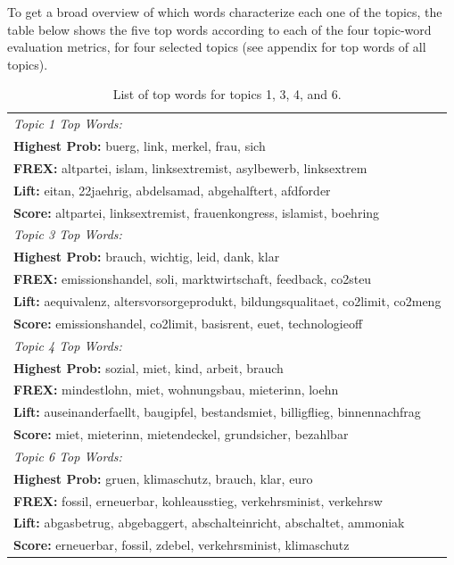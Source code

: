 To get a broad overview of which words characterize each one of the topics, the table below shows the five top words according to each of the four topic-word evaluation metrics, for four selected topics (see appendix for top words of all topics).

\begin{table}[h!]
\centering
\captionsetup{justification=centering,margin=2cm}
\begin{tabular}{|l|}
\hline
\textit{Topic 1 Top Words:}\\
 	 \textbf{Highest Prob:} buerg, link, merkel, frau, sich \\
 	 \textbf{FREX:} altpartei, islam, linksextremist, asylbewerb, linksextrem \\
 	 \textbf{Lift:} eitan, 22jaehrig, abdelsamad, abgehalftert, afdforder \\
 	 \textbf{Score:} altpartei, linksextremist, frauenkongress, islamist, boehring \\
\hline
\textit{Topic 3 Top Words:}\\
 	 \textbf{Highest Prob:} brauch, wichtig, leid, dank, klar \\
 	 \textbf{FREX:} emissionshandel, soli, marktwirtschaft, feedback, co2steu \\
 	 \textbf{Lift:} aequivalenz, altersvorsorgeprodukt, bildungsqualitaet, co2limit, co2meng \\
 	 \textbf{Score:} emissionshandel, co2limit, basisrent, euet, technologieoff \\
\hline
\textit{Topic 4 Top Words:}\\
 	 \textbf{Highest Prob:} sozial, miet, kind, arbeit, brauch \\
 	 \textbf{FREX:} mindestlohn, miet, wohnungsbau, mieterinn, loehn \\
 	 \textbf{Lift:} auseinanderfaellt, baugipfel, bestandsmiet, billigflieg, binnennachfrag \\
 	 \textbf{Score:} miet, mieterinn, mietendeckel, grundsicher, bezahlbar \\
\hline
\textit{Topic 6 Top Words:}\\
 	 \textbf{Highest Prob:} gruen, klimaschutz, brauch, klar, euro \\
 	 \textbf{FREX:} fossil, erneuerbar, kohleausstieg, verkehrsminist, verkehrsw \\
 	 \textbf{Lift:} abgasbetrug, abgebaggert, abschalteinricht, abschaltet, ammoniak \\ 
 	 \textbf{Score:} erneuerbar, fossil, zdebel, verkehrsminist, klimaschutz \\
\hline
\end{tabular}
\caption{List of top words for topics 1, 3, 4, and 6.}
\label{tab:top_words_1346}
\end{table}

